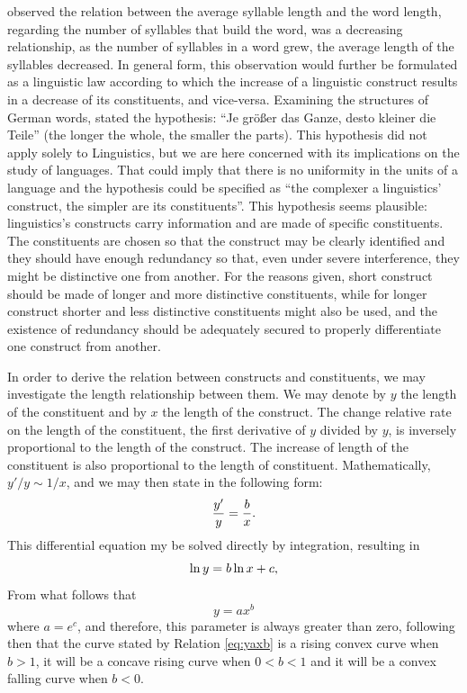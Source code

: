\cite{menzerath1928} observed the relation between the average syllable length and 
the word length, regarding the number of syllables that build the word, was a
decreasing relationship, as the number of syllables in a word grew, the average length
of the syllables decreased. In general form, this observation would further be formulated as
a linguistic law according to which the increase of a linguistic construct results 
in a decrease of its constituents, and vice-versa. 
Examining the structures of German words, \cite{menzerath1954} stated the hypothesis:
``Je größer das Ganze, desto kleiner die Teile'' (the longer the whole, the smaller the parts).
This hypothesis did not apply solely to Linguistics, but we are here concerned with its implications
on the study of languages. That could imply that there is no uniformity in the units of
a language and the hypothesis could be specified as ``the complexer a linguistics' construct,
the simpler are its constituents''. This hypothesis seems plausible: linguistics's constructs
carry information and are made of specific constituents. The constituents are chosen
so that the construct may be clearly identified and they should have enough redundancy so that, 
even under severe interference, they might be distinctive one from another. For the reasons given,
short construct should be made of longer and more distinctive constituents, while for longer
construct shorter and less distinctive constituents might also be used, and the existence of redundancy
should be adequately secured to properly differentiate one construct from another.

In order to derive the relation between constructs and constituents, we may investigate the length
relationship between them. We may denote by $y$ the length of the constituent and by $x$ the length
of the construct. The change relative rate on the length of the constituent, the first derivative of
$y$ divided by $y$, is inversely proportional to the length of the construct. 
The increase of length of the constituent is also proportional to the length of constituent. 
Mathematically,
$y'/y \sim 1/x$, and we may then state in the following form:
\begin{equation}
\frac{y'}{y} = \frac{b}{x} \textmd{.}
\end{equation}
This differential equation my be solved directly by integration, resulting in
\begin{equation}
\ln y = b \ln x + c \textmd{,}
\end{equation}
From what follows that
\begin{equation}
y = a x^b
\label{eq:yaxb}
\end{equation}
where $a = e^c$, and therefore, this parameter is always greater than zero,
following then that the curve stated by Relation \ref{eq:yaxb} is a rising convex curve
when $b > 1$, it will be a concave rising curve when $0 < b < 1$ and it will be
a convex falling curve when $b < 0$.

